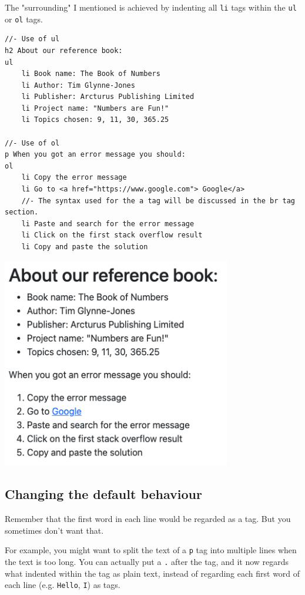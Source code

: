 The "surrounding" I mentioned is achieved by indenting all \texttt{li} tags within the \texttt{ul} or \texttt{ol} tags.
\vspace{6mm}

\begin{lstlisting}[language=pug]
//- Use of ul
h2 About our reference book:
ul
    li Book name: The Book of Numbers
    li Author: Tim Glynne-Jones
    li Publisher: Arcturus Publishing Limited
    li Project name: "Numbers are Fun!"
    li Topics chosen: 9, 11, 30, 365.25
    
//- Use of ol
p When you got an error message you should:
ol
    li Copy the error message
    li Go to <a href="https://www.google.com"> Google</a>
    //- The syntax used for the a tag will be discussed in the br tag section.
    li Paste and search for the error message
    li Click on the first stack overflow result
    li Copy and paste the solution
\end{lstlisting}

\includegraphics[width=10cm]{images/ch5-ulol.png}

\subsection*{Changing the default behaviour}

Remember that the first word in each line would be regarded as a tag. But you sometimes don't want that. 
\vspace{6mm}

For example, you might want to split the text of a \texttt{p} tag into multiple lines when the text is too long. You can actually put a \texttt{.} after the tag, and it now regards what indented within the tag as plain text, instead of regarding each first word of each line (e.g. \texttt{Hello}, \texttt{I}) as tags.

